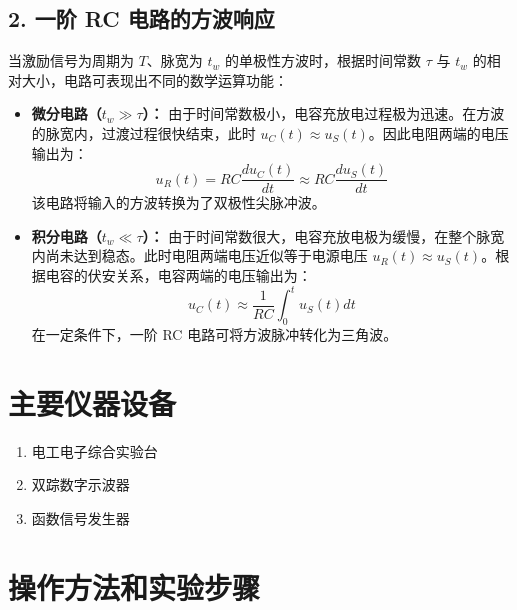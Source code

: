 \documentclass[10.5pt]{config}
\begin{document}
\subsection*{2. 一阶 RC 电路的方波响应}

当激励信号为周期为 $T$、脉宽为 $t_w$ 的单极性方波时，根据时间常数 $\tau$ 与 $t_w$ 的相对大小，电路可表现出不同的数学运算功能：

\begin{itemize}[leftmargin=2em]
    \item \textbf{微分电路（$t_w \gg \tau$）：} 
    由于时间常数极小，电容充放电过程极为迅速。在方波的脉宽内，过渡过程很快结束，此时 $u_C(t) \approx u_S(t)$。因此电阻两端的电压输出为：
    \begin{equation*}
        u_R(t) = RC \frac{du_C(t)}{dt} \approx RC \frac{du_S(t)}{dt}
    \end{equation*}
    该电路将输入的方波转换为了双极性尖脉冲波。

    \item \textbf{积分电路（$t_w \ll \tau$）：}
    由于时间常数很大，电容充放电极为缓慢，在整个脉宽内尚未达到稳态。此时电阻两端电压近似等于电源电压 $u_R(t) \approx u_S(t)$。根据电容的伏安关系，电容两端的电压输出为：
    \begin{equation*}
        u_C(t) \approx \frac{1}{RC} \int_0^t u_S(t) dt
    \end{equation*}
    在一定条件下，一阶 RC 电路可将方波脉冲转化为三角波。
\end{itemize}


\section{主要仪器设备}
\begin{enumerate}[label=\arabic*., leftmargin=2em]
    \item 电工电子综合实验台
    \item 双踪数字示波器
    \item 函数信号发生器
\end{enumerate}


\section{操作方法和实验步骤}
\end{document}
